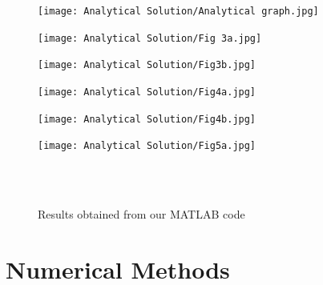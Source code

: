 \documentclass[12pt]{article}
\begin{document}
\begin{figure}[H]
\begin{minipage}{.5\textwidth}
    \hspace{-1.4cm}
    \vspace{-1.4cm}
  \texttt{[image: Analytical Solution/Analytical graph.jpg]}
  \label{fig:4}
\end{minipage}%
\begin{minipage}{.5\textwidth}
  \hspace{-0.5cm}
  \vspace{-1cm}
  \texttt{[image: Analytical Solution/Fig 3a.jpg]}
  \label{fig:5}
\end{minipage}
\end{figure}

\begin{figure}[H]
\begin{minipage}{.5\textwidth}
  \hspace{-1.4cm}
  \vspace{-1.4cm}
  \texttt{[image: Analytical Solution/Fig3b.jpg]}
  \label{fig:6}
\end{minipage}%
\begin{minipage}{.5\textwidth}
  \hspace{-0.5cm}
   \vspace{-1.4cm}
  \texttt{[image: Analytical Solution/Fig4a.jpg]}
  \label{fig:7}
\end{minipage}
\end{figure}

\begin{figure}[H]
\begin{minipage}{.5\textwidth}
  \hspace{-1.4cm}
  \vspace{-1.4cm}
  \texttt{[image: Analytical Solution/Fig4b.jpg]}
  \label{fig:8}
\end{minipage}%
\begin{minipage}{.5\textwidth}
  \hspace{-0.5cm}
  \vspace{-1.4cm}
  \texttt{[image: Analytical Solution/Fig5a.jpg]}
  \label{fig:9}
\end{minipage}
\\ \\  
\caption{Results obtained from our MATLAB code}
\end{figure}

\section{Numerical Methods}
\end{document}
